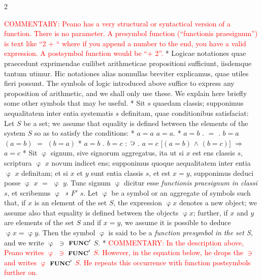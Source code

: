 \documentclass{book}
\newcommand{\C}{\mathop{\sbox0{$\displaystyle$$\reflectbox{C}$} %
\raisebox{-\height+\ht0-0.05cm}[\ht0][\dp0]{\scalebox{0.8}[0.8]{\copy0}}}\displaylimits} %
\newcommand{\such}{\thinspace \rotatebox[origin=c]{180}{$\epsilon$}}
\newcommand{\func}{\mathord{\text{{\footnotesize \textbf{FUNC}}}}}
\renewcommand{\rightarrow}{\Rightarrow}
\newcommand\commentary[1]{\textcolor{red}{COMMENTARY: #1}}
\newenvironment{translateTwoCol}
               { %
                 \columnratio{0.5, 0.5}
                 \begin{paracol}{2}
                 \newcommand{\LAT}{\switchcolumn[0]*}
                 \newcommand{\ENG}{\switchcolumn[1]}
               }
               { %
                 \let\ENG\undefined
                 \let\LAT\undefined
                 \end{paracol}
               }
\begin{document}
\begin{translateTwoCol}
\ENG
\commentary{Peano has a very structural or syntactical version of a function.  There is no parameter.  A presymbol function (``functionis praesignum'') is text like ``2 + `` where if you append a number to the end, you have a valid expression.   A postsymbol function would be ``+ 2''.} 
\LAT  
Logicae notationes quae praecedunt exprimendae cuilibet arithmeticae propositioni sufficiunt, iisdemque tantum utimur. Hic notationes alias nonnullas breviter explicamus, quae utiles fieri possunt.
\ENG
The symbols of logic introduced above suffice to express any proposition of arithmetic, and we shall only use these.  We explain here briefly some other symbols that may be useful. %
\LAT
Sit $s$ quaedam classis; supponimus aequalitatem inter entia systematis $s$ definitam, quae conditionibus satisfaciat:
\ENG
Let $S$ be a set; we assume that equality is defined between the elements of the system $S$ so as to satisfy the conditions:
\LAT
\hspace{1.06cm} $a=a$
\ENG
\hspace{1.06cm} $a=a$.
\LAT
\hspace{1.06cm} $a=b$ $.$ $=$ $.$ $b=a$
\ENG
\hspace{1.06cm} $(a=b)$ $=$ $(b=a)$
\LAT
\hspace{1.06cm} $a=b$ . $b=c$ $:$ $\C$ $.$ $a=c$
\ENG
\hspace{1.06cm} $[(a=b)$ $\wedge$ $(b=c)]$ $\rightarrow$ $a=c$
\LAT
Sit $\upvarphi$ signum, sive signorum aggregatus, ita ut si $x$ est ens classis $s$, scriptura $\upvarphi$ $x$ novum indicet ens; supponimus quoque aequalitatem inter entia $\upvarphi$ $x$ definitam; et si $x$ et $y$ sunt entia classis $s$, et est $x=y$, supponimus deduci posse $\upvarphi$ $x$ $=$ $\upvarphi$ $y$. Tunc signum $\upvarphi$ dicitur esse \emph{functionis praesignum in classi} $s$, et scribemus $\upvarphi$ $\such$ $F'$ $s$.
\ENG
Let $\upvarphi$ be a symbol or an aggregate of symbols such that, if $x$ is an element of the set $S$, the expression $\upvarphi x$ denotes a new object; we assume also that equality is defined between the objects $\upvarphi x$; further, if $x$ and $y$ are elements of the set $S$ and if $x = y$, we assume it is possible to deduce $\upvarphi x = \upvarphi y$. Then the symbol $\upvarphi$ is said to be a \emph{function presymbol in the set S}, and we write $\upvarphi$ $\ni$ $\func'$ $S$.
\LAT
\ENG
\commentary{In the description above, Peano writes $\upvarphi$ $\ni$ $\func'$ $S$.  However, in the equation below, he drops the $\ni$ and writes $\upvarphi$ $\func'$ $S$.  He repeats this occurrence with function postsymbols further on.}

\end{translateTwoCol}
\end{document}
